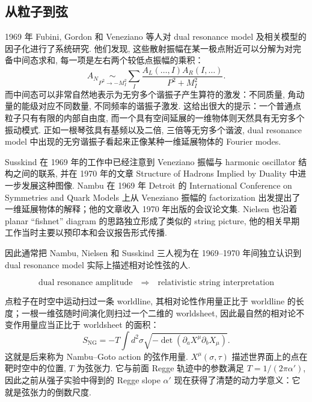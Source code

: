 \documentclass[10pt]{article}
\newcounter{ex}[section]\setcounter{ex}{0}
\numberwithin{equation}{section}
\begin{document}
\subsection{从粒子到弦}

1969 年 Fubini, Gordon 和 Veneziano 等人对 dual resonance model 及相关模型的因子化进行了系统研究\cite{FubiniGordonVeneziano1969}. 他们发现, 这些散射振幅在某一极点附近可以分解为对完备中间态求和, 每一项是左右两个较低点振幅的乘积：
\begin{equation}\label{frac}
A_N\underset{P^2\to-M_I^2}{\sim}
\sum_{I}\frac{A_L(\ldots,I)A_R(I,\ldots)}{P^2+M_I^2}.
\end{equation}
而中间态可以非常自然地表示为无穷多个谐振子产生算符的激发：不同质量, 角动量的能级对应不同数量, 不同频率的谐振子激发. 这给出很大的提示：一个普通点粒子只有有限的内部自由度, 而一个具有空间延展的一维物体则天然具有无穷多个振动模式. 正如一根琴弦具有基频以及二倍, 三倍等无穷多个谐波, dual resonance model 中出现的无穷谐振子看起来正像某种一维延展物体的 Fourier modes. 

Susskind 在 1969 年的工作中已经注意到 Veneziano 振幅与 harmonic oscillator 结构之间的联系, 并在 1970 年的文章 Structure of Hadrons Implied by Duality 中进一步发展这种图像. Nambu 在 1969 年 Detroit 的 International Conference on Symmetries and Quark Models 上从 Veneziano 振幅的 factorization 出发提出了一维延展物体的解释；他的文章收入 1970 年出版的会议论文集. Nielsen 也沿着 planar “fishnet” diagram 的思路独立形成了类似的 string picture, 他的相关早期工作当时主要以预印本和会议报告形式传播. 

因此通常把 Nambu, Nielsen 和 Susskind 三人视为在 1969–1970 年间独立认识到 dual resonance model 实际上描述相对论性弦的人\cite{Susskind1970,CappelliEtAl2012}. 

\begin{equation}
\text{dual resonance amplitude}
\quad\Longrightarrow\quad
\text{relativistic string interpretation}
\end{equation}

点粒子在时空中运动扫过一条 worldline, 其相对论性作用量正比于 worldline 的长度；一根一维弦随时间演化则扫过一个二维的 worldsheet, 因此最自然的相对论不变作用量应当正比于 worldsheet 的面积：
\begin{equation} 
S_{\mathrm{NG}}=-T\int d^2\sigma\sqrt{-\det\left (\partial_aX^\mu\partial_bX_\mu\right)}.
\end{equation}
这就是后来称为 Nambu–Goto action 的弦作用量. $X^\mu(\sigma,\tau)$ 描述世界面上的点在靶时空中的位置, $T$ 为弦张力. 它与前面 Regge 轨迹中的参数满足 $T=1/(2\pi\alpha')$, 因此之前从强子实验中得到的 Regge slope $\alpha'$ 现在获得了清楚的动力学意义：它就是弦张力的倒数尺度. 
\end{document}
